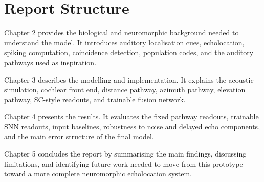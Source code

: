 \section{Report Structure}

Chapter 2 provides the biological and neuromorphic background needed to understand the model. It introduces auditory localisation cues, echolocation, spiking computation, coincidence detection, population codes, and the auditory pathways used as inspiration.

Chapter 3 describes the modelling and implementation. It explains the acoustic simulation, cochlear front end, distance pathway, azimuth pathway, elevation pathway, SC-style readouts, and trainable fusion network.

Chapter 4 presents the results. It evaluates the fixed pathway readouts, trainable SNN readouts, input baselines, robustness to noise and delayed echo components, and the main error structure of the final model.

Chapter 5 concludes the report by summarising the main findings, discussing limitations, and identifying future work needed to move from this prototype toward a more complete neuromorphic echolocation system.
